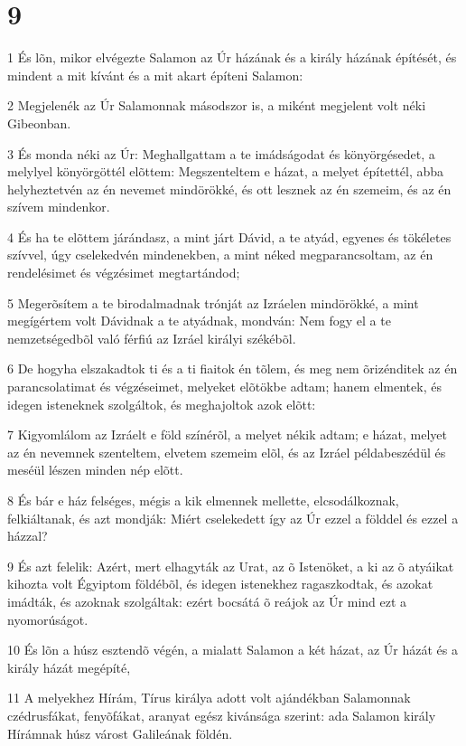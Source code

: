 \chapter{9}

\par 1 És lõn, mikor elvégezte Salamon az Úr házának és a király házának építését, és mindent a mit kívánt és a mit akart építeni Salamon:
\par 2 Megjelenék az Úr Salamonnak másodszor is, a miként megjelent volt néki Gibeonban.
\par 3 És monda néki az Úr: Meghallgattam a te imádságodat és könyörgésedet, a melylyel könyörgöttél elõttem: Megszenteltem e házat, a melyet építettél, abba helyheztetvén az én nevemet mindörökké, és ott lesznek az én szemeim, és az én szívem  mindenkor.
\par 4 És ha te elõttem járándasz, a mint járt Dávid, a te atyád, egyenes és tökéletes szívvel, úgy cselekedvén mindenekben, a mint néked megparancsoltam, az én rendelésimet és végzésimet megtartándod;
\par 5 Megerõsítem a te birodalmadnak trónját az Izráelen mindörökké, a mint megígértem volt Dávidnak a te atyádnak, mondván: Nem fogy el a te nemzetségedbõl  való férfiú az Izráel királyi székébõl.
\par 6 De hogyha elszakadtok ti és a ti fiaitok én tõlem, és meg nem õrizénditek az én parancsolatimat és végzéseimet, melyeket elõtökbe adtam; hanem elmentek, és idegen isteneknek szolgáltok, és meghajoltok azok elõtt:
\par 7 Kigyomlálom az Izráelt e föld színérõl, a melyet nékik adtam; e házat, melyet az én nevemnek szenteltem, elvetem szemeim elõl, és az Izráel példabeszédül és meséül lészen minden nép elõtt.
\par 8 És bár e ház felséges, mégis a kik elmennek mellette, elcsodálkoznak, felkiáltanak, és azt mondják: Miért cselekedett így az Úr ezzel a földdel és ezzel a házzal?
\par 9 És azt felelik: Azért, mert elhagyták az Urat, az õ Istenöket, a ki az õ atyáikat kihozta volt Égyiptom földébõl, és idegen istenekhez ragaszkodtak, és azokat imádták, és azoknak szolgáltak: ezért bocsátá õ reájok az Úr mind ezt a nyomorúságot.
\par 10 És lõn a húsz esztendõ végén, a mialatt Salamon a két házat, az Úr házát és a király házát megépíté,
\par 11 A melyekhez Hírám, Tírus királya adott volt ajándékban Salamonnak czédrusfákat, fenyõfákat, aranyat egész kivánsága szerint: ada Salamon király Hírámnak húsz várost Galileának földén.
